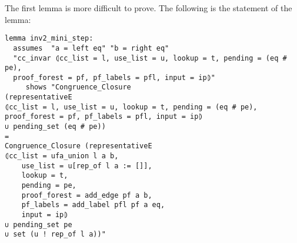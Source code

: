 The first lemma is more difficult to prove. The following is the statement of the lemma:

\begin{lstlisting}[label=lst:inv2_mini_step]
lemma inv2_mini_step:
  assumes  "a = left eq" "b = right eq"
  "cc_invar ⦇cc_list = l, use_list = u, lookup = t, pending = (eq # pe),
  proof_forest = pf, pf_labels = pfl, input = ip⦈"
     shows "Congruence_Closure
(representativeE
⦇cc_list = l, use_list = u, lookup = t, pending = (eq # pe),
proof_forest = pf, pf_labels = pfl, input = ip⦈
∪ pending_set (eq # pe))
=
Congruence_Closure (representativeE
⦇cc_list = ufa_union l a b,
    use_list = u[rep_of l a := []],
    lookup = t,
    pending = pe,
    proof_forest = add_edge pf a b,
    pf_labels = add_label pfl pf a eq,
    input = ip⦈
∪ pending_set pe
∪ set (u ! rep_of l a))"
\end{lstlisting}

